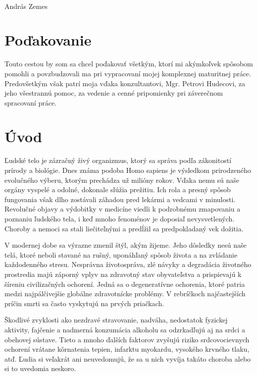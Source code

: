 \documentclass[titlepage,12pt]{article}
\begin{document}
\vspace{10mm}
\hrulefill
\\\hspace*{0mm}\phantom{v.r.: }András Zemes

\newpage
\vspace*{\fill}
\section*{Poďakovanie}
Touto cestou by som sa chcel poďakovať všetkým, ktorí mi akýmkoľvek spôsobom pomohli a povzbudzovali ma pri vypracovaní mojej komplexnej maturitnej práce. Predovšetkým však patrí moja vďaka konzultantovi, Mgr. Petrovi Hudecovi, za jeho všestrannú pomoc, za vedenie a cenné pripomienky pri záverečnom spracovaní práce.

\newpage
\tableofcontents

\newpage
\section{Úvod}
Ľudské telo je zázračný živý organizmus, ktorý sa správa podľa zákonitostí prírody a biológie. Dnes známa podoba Homo sapiens je výsledkom prirodzeného evolučného výberu, ktorým prechádza už milióny rokov. Vďaka nemu sú naše orgány vyspelé a odolné, dokonale slúžia prežitiu. Ich rola a presný spôsob fungovania však dlho zostávali záhadou pred lekármi a vedcami v minulosti. Revolučné objavy a výdobitky v medicíne viedli k podrobnému zmapovaniu a poznaniu ľudského tela, i keď mnoho fenoménov je doposiaľ nevysvetlených. Choroby a nemoci sa stali liečiteľnými a predĺžil sa predpokladaný vek dožitia.

V modernej dobe sa výrazne zmenil štýl, akým žijeme. Jeho dôsledky nesú naše telá, ktoré neboli stavané na rušný, uponáhľaný spôsob života a na zvládanie každodenného stresu. Nesprávna životospráva, zlé návyky a degradácia životného prostredia majú záporný vplyv na zdravotný stav obyvateľstva a prispievajú k šíreniu civilizačných ochorení. Jedná sa o degeneratívne ochorenia, ktoré patria medzi najpálčivejšie globálne zdravotnícke problémy. V rebríčkoch najčastejších príčin smrti sa často vyskytujú na prvých priačkach.

Škodlivé zvyklosti ako nezdravé stravovanie, nadváha, nedostatok fyzickej aktivity, fajčenie a nadmerná konzumácia alkoholu sa odzrkadľujú aj na srdci a obehovej sústave. Tieto a mnoho ďalších faktorov zvyšujú riziko srdcovocievnych ochorení vrátane kôrnatenia tepien, infarktu myokardu, vysokého krvného tlaku, atď. Ľudia si veľakrát ani neuvedomujú, že sa u nich vyvíja takáto choroba alebo si to uvedomia neskoro.
\end{document}
